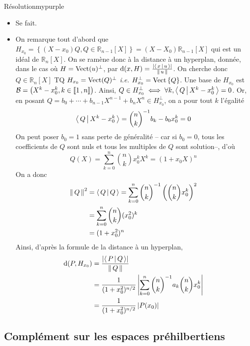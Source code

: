         \begin{demo}{Résolution}{mypurple}
            \begin{itemize}
                \item Se fait.
                \item On remarque tout d’abord que $H_{x_0} = \left\{(X - x_0)Q, Q \in \mathbb{R}_{n-1}[X]\right\} = (X - X_0) \mathbb{R}_{n-1}[X]$ qui est un idéal de $\mathbb{R}_n[X]$. On se ramène donc à la distance à un hyperplan, donnée, dans le cas où $H = \operatorname{Vect}(u)^{\perp}$, par $\operatorname{d}(x,H) = \frac{\left\lvert \left<\,x\,\middle|\,u\,\right>\right\rvert}{\left\lVert\,u\,\right\rVert}$. On cherche donc $Q \in \mathbb{R}_n[X]$ TQ $H_{x_0} = \operatorname{Vect}(Q)^{\perp}$ \textit{i.e.} $H_{x_0}^{\perp} = \operatorname{Vect}\left\{Q\right\}$. Une base de $H_{x_0}$ est $\mathcal{B} = \left(X^k - x_0^k , k \in \left\llbracket 1 \, , n \right\rrbracket\right)$. Ainsi, $Q \in H_{x_0}^{\perp} \iff \forall k, \left<\,Q\,\middle|\,X^k - x_0^k\,\right> = 0$. Or, en posant $Q = b_0 + \cdots + b_{n-1}X^{n-1} + b_n X^n \in H_{x_0}^{\perp}$, on a pour tout $k$ l’égalité \[ \left<\,Q\,\middle|\,X^k - x_0^k\,\right> = \binom{n}{k}^{-1} b_k - b_0 x_0^k = 0\]   
                On peut poser $b_0 = 1$ sans perte de généralité -- car si $b_0 = 0$, tous les coefficients de $Q$ sont nuls et tous les multiples de $Q$ sont solution--, d’où 
                \[ Q(X) = \sum_{k=0}^{n} \binom{n}{k } x_0^k X^k = \left(1 + x_0 X\right)^n \]    
                On a donc \begin{align*}
                    \left\lVert\,Q\,\right\rVert^2 
                    &= \left<\,Q\,\middle|\,Q\,\right> = \sum_{k=0}^{n} \binom{n }{k }^{-1} \left(\binom{n }{k } x_0^k\right)^2 \\
                    &= \sum_{k=0}^{n} \binom{n }{k } (x_0^2)^k \\
                    &= (1 + x_0^2)^n
                \end{align*}
                Ainsi, d’après la formule de la distance à un hyperplan,  
                \begin{align*}
                    \operatorname{d}(P,H_{x_0}) 
                    &= \frac{\left\lvert \left<\,P\,\middle|\,Q\,\right>\right\rvert}{\left\lVert\,Q\,\right\rVert} \\
                    &= \frac{1}{(1 + x_0^2)^{n / 2}} \left\lvert \sum_{k=0}^{n} \binom{n }{k }^{-1} a_k \binom{n }{k } x_0^k\right\rvert \\
                    &= \frac{1}{(1 + x_0^2)^{n / 2}} \left\lvert P(x_0)\right\rvert
                \end{align*}
            \end{itemize}  
        \end{demo}

    \subsection{Complément sur les espaces préhilbertiens}

